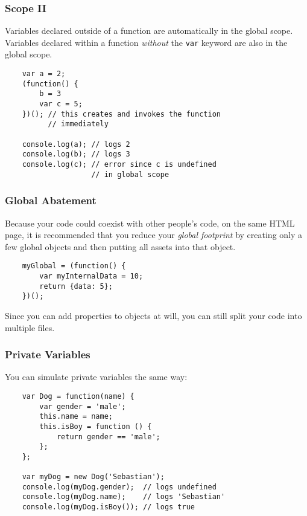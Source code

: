 \documentclass{lug}
\begin{document}
\begin{frame}[fragile]
    \frametitle{Scope II}

    Variables declared outside of a function are automatically in the global scope.\\

    Variables declared within a function \textit{without} the \texttt{var} keyword are also in the
    global scope.

    \begin{verbatim}
    var a = 2;
    (function() {
        b = 3
        var c = 5;
    })(); // this creates and invokes the function
          // immediately

    console.log(a); // logs 2
    console.log(b); // logs 3
    console.log(c); // error since c is undefined
                    // in global scope
    \end{verbatim}
\end{frame}

\begin{frame}[fragile]
    \frametitle{Global Abatement}
    Because your code could coexist with other people's code, on the same HTML page, it is
    recommended that you reduce your \textit{global footprint} by creating only a few global objects
    and then putting all assets into that object.

    \begin{verbatim}
    myGlobal = (function() {
        var myInternalData = 10;
        return {data: 5};
    })();
    \end{verbatim}

    Since you can add properties to objects at will, you can still split your code into multiple
    files.
\end{frame}

\begin{frame}[fragile]
    \frametitle{Private Variables}

    You can simulate private variables the same way:

    \begin{verbatim}
    var Dog = function(name) {
        var gender = 'male';
        this.name = name;
        this.isBoy = function () {
            return gender == 'male';
        };
    };

    var myDog = new Dog('Sebastian');
    console.log(myDog.gender);  // logs undefined
    console.log(myDog.name);    // logs 'Sebastian'
    console.log(myDog.isBoy()); // logs true
    \end{verbatim}
\end{frame}
\end{document}
